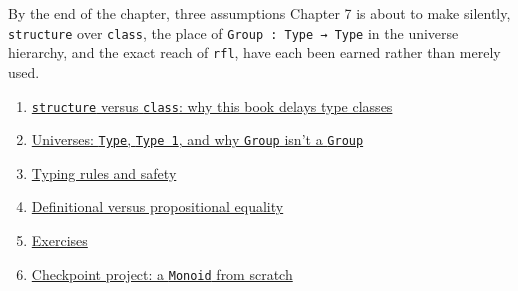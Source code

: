 By the end of the chapter, three assumptions Chapter 7 is about to make silently, \texttt{structure} over \texttt{class}, the place of \texttt{Group : Type → Type} in the universe hierarchy, and the exact reach of \texttt{rfl}, have each been earned rather than merely used.


\begin{enumerate}
\def\labelenumi{\arabic{enumi}.}
\tightlist
\item
  \hyperref[sec:06-rigor-check:01-structure-vs-class:1]{\texttt{structure} versus \texttt{class}: why this book delays type classes}
\item
  \hyperref[sec:06-rigor-check:02-universes:1]{Universes: \texttt{Type}, \texttt{Type 1}, and why \texttt{Group} isn't a \texttt{Group}}
\item
  \hyperref[sec:06-rigor-check:03-typing-rules-and-safety:1]{Typing rules and safety}
\item
  \hyperref[sec:06-rigor-check:04-defeq-vs-propeq:1]{Definitional versus propositional equality}
\item
  \hyperref[sec:06-rigor-check:05-exercises:1]{Exercises}
\item
  \hyperref[sec:06-rigor-check:06-checkpoint-project:1]{Checkpoint project: a \texttt{Monoid} from scratch}
\end{enumerate}







